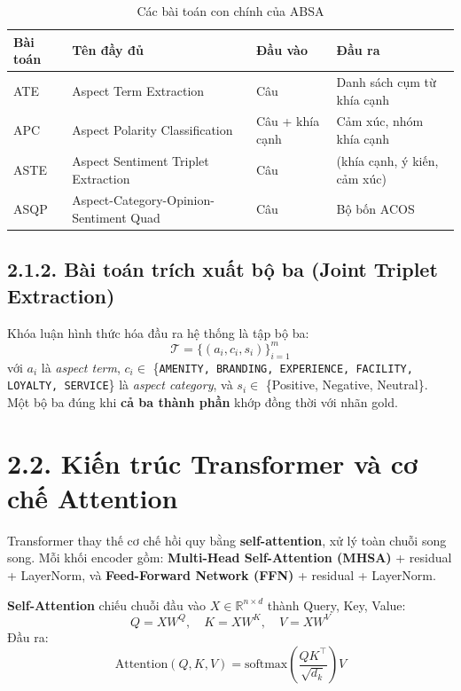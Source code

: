 \begin{table}[H]
\centering
\caption{Các bài toán con chính của ABSA}
\label{tab:absa_subtasks}
\small
\begin{tabular}{@{}llll@{}}
\toprule
\textbf{Bài toán} & \textbf{Tên đầy đủ} & \textbf{Đầu vào} & \textbf{Đầu ra} \\
\midrule
ATE  & Aspect Term Extraction & Câu & Danh sách cụm từ khía cạnh \\
APC  & Aspect Polarity Classification & Câu + khía cạnh & Cảm xúc, nhóm khía cạnh \\
ASTE & Aspect Sentiment Triplet Extraction & Câu & (khía cạnh, ý kiến, cảm xúc) \\
ASQP & Aspect-Category-Opinion-Sentiment Quad & Câu & Bộ bốn ACOS \\
\bottomrule
\end{tabular}
\end{table}

\subsection{2.1.2.\; Bài toán trích xuất bộ ba (Joint Triplet Extraction)}
\label{subsec:triplet}

Khóa luận hình thức hóa đầu ra hệ thống là tập bộ ba:
\begin{equation}
\mathcal{T} = \{(a_i, c_i, s_i)\}_{i=1}^{m}
\label{eq:triplet}
\end{equation}
với $a_i$ là \textit{aspect term}, $c_i \in$ \{\texttt{AMENITY, BRANDING,
EXPERIENCE, FACILITY, LOYALTY, SERVICE}\} là \textit{aspect category},
và $s_i \in$ \{Positive, Negative, Neutral\}. Một bộ ba đúng khi
\textbf{cả ba thành phần} khớp đồng thời với nhãn gold.

\section{2.2.\; Kiến trúc Transformer và cơ chế Attention}
\label{sec:transformer}

Transformer \cite{vaswani2023attentionneed} thay thế cơ chế hồi quy
bằng \textbf{self-attention}, xử lý toàn chuỗi song song. Mỗi khối
encoder gồm: \textbf{Multi-Head Self-Attention (MHSA)} + residual +
LayerNorm, và \textbf{Feed-Forward Network (FFN)} + residual + LayerNorm.

\textbf{Self-Attention} chiếu chuỗi đầu vào $X \in \mathbb{R}^{n \times d}$
thành Query, Key, Value:
\begin{equation}
Q = XW^Q,\quad K = XW^K,\quad V = XW^V
\end{equation}
Đầu ra:
\begin{equation}
\text{Attention}(Q,K,V) = \text{softmax}\!\left(\frac{QK^\top}{\sqrt{d_k}}\right)V
\label{eq:attention}
\end{equation}

